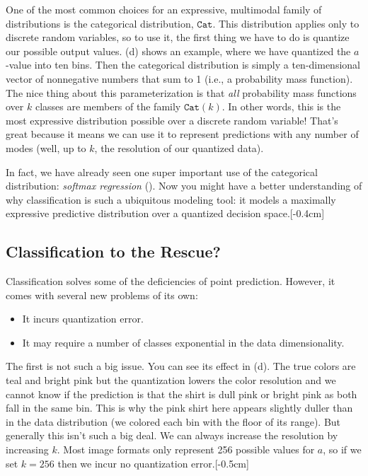 One of the most common choices for an expressive, multimodal family of distributions is the categorical distribution, $\texttt{Cat}$. This distribution applies only to discrete random variables, so to use it, the first thing we have to do is quantize our possible output values. \Fig{\ref{fig:conditional_generative_models:tshirts}}(d) shows an example, where we have quantized the $a$-value into ten bins. Then the categorical distribution is simply a ten-dimensional vector of nonnegative numbers that sum to 1 (i.e., a probability mass function). The nice thing about this parameterization is that \textit{all} probability mass functions over $k$ classes are members of the family $\texttt{Cat}(k)$. In other words, this is the most expressive distribution possible over a discrete random variable! That's great because it means we can use it to represent predictions with any number of modes (well, up to $k$, the resolution of our quantized data).

In fact, we have already seen one super important use of the categorical distribution: \textit{softmax regression} (\sect{\ref{sec:intro_to_learning:image_classification}}). Now you might have a better understanding of why classification is such a ubiquitous modeling tool: it models a maximally expressive predictive distribution over a quantized decision space.[-0.4cm]

\subsection{Classification to the Rescue?}

Classification solves some of the deficiencies of point prediction. However, it comes with several new problems of its own:
\begin{itemize}
    \item It incurs quantization error.
    \item It may require a number of classes exponential in the data dimensionality.
\end{itemize}
The first is not such a big issue. You can see its effect in \fig{\ref{fig:conditional_generative_models:tshirts}}(d). The true colors are teal and bright pink but the quantization lowers the color resolution and we cannot know if the prediction is that the shirt is dull pink or bright pink as both fall in the same bin. This is why the pink shirt here appears slightly duller than in the data distribution (we colored each bin with the floor of its range). But generally this isn't such a big deal. We can always increase the resolution by increasing $k$. Most image formats only represent 256 possible values for $a$, so if we set $k=256$ then we incur no quantization error.[-0.5cm]

